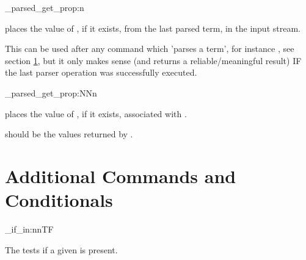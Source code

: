 \documentclass[10pt]{article}
\begin{document}
\begin{codedescribe}[code,EXP,new=2023/05/20]{\starray_parsed_get_prop:n}
\begin{codesyntax}%
\end{codesyntax}
 places the value of , if it exists, from the last parsed term, in the input stream. 
\end{codedescribe}
\begin{tsremark}
This can be used after any command which 'parses a term', for instance , see section \ref{conditionals:terms}, but it only makes sense (and returns a reliable/meaningful result) IF the last parser operation was successfully executed.
\end{tsremark}


\begin{codedescribe}[code,EXP,new=2023/11/28]{\starray_parsed_get_prop:NNn}
\begin{codesyntax}%
\end{codesyntax}
 places the value of , if it exists, associated with .
\end{codedescribe}
\begin{tsremark}
 should be the values returned by \break {}.
\end{tsremark}


\section{Additional Commands and Conditionals}\label{conditionals:terms}

\begin{codedescribe}{\starray_if_in:nnTF}
\begin{codesyntax}%
\end{codesyntax}
The  tests if a given  is present.
\end{codedescribe}
\end{document}
